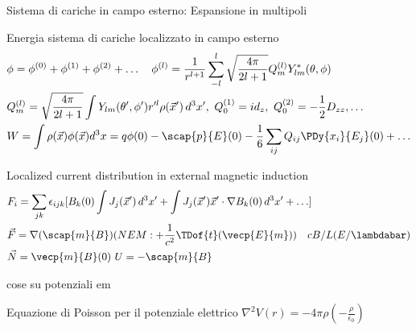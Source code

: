 \begin{frame}{Sistema di cariche in campo esterno: Espansione in multipoli}
\begin{block}{Energia sistema di cariche localizzato in campo esterno}
\begin{align*}
    &\phi=\phi^{(0)}+\phi^{(1)}+\phi^{(2)}+\ldots \quad \phi^{(l)}=\frac{1}{r^{l+1}}\sum_{-l}^l\sqrt{\frac{4\pi}{2l+1}}Q_m^{(l)}Y_{lm}^*(\theta,\phi)\\
    &Q_m^{(l)}=\sqrt{\frac{4\pi}{2l+1}}\int Y_{lm}(\theta',\phi')r'^l\rho(\vec{x}')\,d^3x',\ Q_0^{(1)}=id_z,\ Q_0^{(2)}=-\frac{1}{2}D_{zz},\ldots\\
    &W=\int\rho(\vec{x})\phi(\vec{x})d^3x=q\phi(0)-\scap{p}{E}(0)-\frac{1}{6}\sum_{ij}Q_{ij}\PDy{x_i}{E_j}(0)+\ldots
\end{align*}
\end{block}
\begin{block}{Localized current distribution in external magnetic induction}
\begin{align*}
    &F_i=\sum_{jk}\epsilon_{ijk}[B_k(0)\int J_j(\vec{x}')\,d^3x'+\int J_j(\vec{x}')\vec{x}'\cdot\nabla B_k(0)\,d^3x'+\ldots]\\
    &\vec{F}=\nabla(\scap{m}{B})(NEM: +\frac{1}{c^2}\TDof{t}(\vecp{E}{m}))\quad cB/L(E/\lambdabar)\\
    &\vec{N}=\vecp{m}{B}(0)\ U=-\scap{m}{B}
\end{align*}
\end{block}
\end{frame}

\begin{wordonframe}{cose su potenziali em}

Equazione di Poisson per il potenziale elettrico $\nabla^2 V(r)=-4\pi \rho (-\frac{\rho}{\epsilon_0})$

\end{wordonframe}

